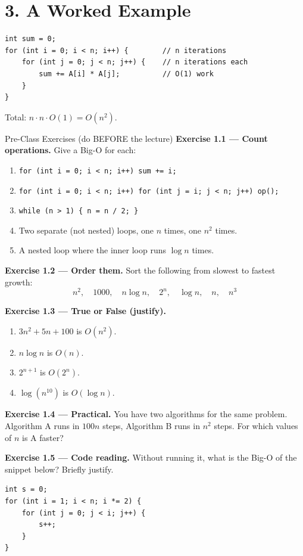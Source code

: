 \documentclass[11pt]{article}
\begin{document}
\section*{3. A Worked Example}

\begin{lstlisting}
int sum = 0;
for (int i = 0; i < n; i++) {        // n iterations
    for (int j = 0; j < n; j++) {    // n iterations each
        sum += A[i] * A[j];          // O(1) work
    }
}
\end{lstlisting}
Total: $n \cdot n \cdot O(1) = O(n^2)$.

\begin{exbox}{Pre-Class Exercises (do BEFORE the lecture)}
\textbf{Exercise 1.1 --- Count operations.} Give a Big-O for each:
\begin{enumerate}[label=(\alph*)]
  \item \verb|for (int i = 0; i < n; i++) sum += i;|
  \item \verb|for (int i = 0; i < n; i++) for (int j = i; j < n; j++) op();|
  \item \verb|while (n > 1) { n = n / 2; }|
  \item Two separate (not nested) loops, one $n$ times, one $n^2$ times.
  \item A nested loop where the inner loop runs $\log n$ times.
\end{enumerate}

\textbf{Exercise 1.2 --- Order them.} Sort the following from slowest to fastest growth:
\[
n^2,\quad 1000,\quad n\log n,\quad 2^n,\quad \log n,\quad n,\quad n^3
\]

\textbf{Exercise 1.3 --- True or False (justify).}
\begin{enumerate}[label=(\alph*)]
  \item $3n^2 + 5n + 100$ is $O(n^2)$.
  \item $n\log n$ is $O(n)$.
  \item $2^{n+1}$ is $O(2^n)$.
  \item $\log(n^{10})$ is $O(\log n)$.
\end{enumerate}

\textbf{Exercise 1.4 --- Practical.} You have two algorithms for the same problem. Algorithm A runs in $100n$ steps, Algorithm B runs in $n^2$ steps. For which values of $n$ is A faster?

\textbf{Exercise 1.5 --- Code reading.} Without running it, what is the Big-O of the snippet below? Briefly justify.
\begin{lstlisting}
int s = 0;
for (int i = 1; i < n; i *= 2) {
    for (int j = 0; j < i; j++) {
        s++;
    }
}
\end{lstlisting}
\end{exbox}
\end{document}
